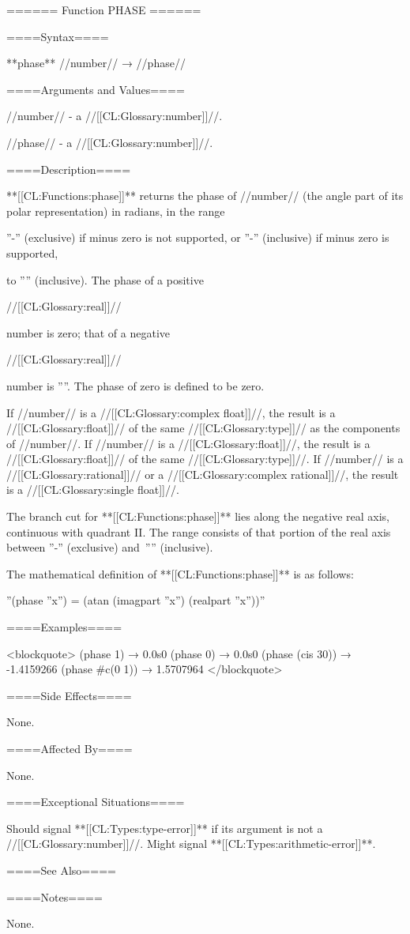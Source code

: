 ====== Function PHASE ======

====Syntax====

**phase** //number// → //phase//

====Arguments and Values====

//number// - a //[[CL:Glossary:number]]//.

//phase// - a //[[CL:Glossary:number]]//.

====Description====

**[[CL:Functions:phase]]** returns the phase of //number// (the angle part of its polar representation) in radians, in the range

''-\pi'' (exclusive) if minus zero is not supported, or ''-\pi'' (inclusive) if minus zero is supported,

to ''\pi'' (inclusive). The phase of a positive

//[[CL:Glossary:real]]//

number is zero; that of a negative

//[[CL:Glossary:real]]//

number is ''\pi''. The phase of zero is defined to be zero.

If //number// is a //[[CL:Glossary:complex float]]//, the result is a //[[CL:Glossary:float]]// of the same //[[CL:Glossary:type]]// as the components of //number//. If //number// is a //[[CL:Glossary:float]]//, the result is a //[[CL:Glossary:float]]// of the same //[[CL:Glossary:type]]//. If //number// is a //[[CL:Glossary:rational]]// or a //[[CL:Glossary:complex rational]]//, the result is a //[[CL:Glossary:single float]]//.

The branch cut for **[[CL:Functions:phase]]** lies along the negative real axis, continuous with quadrant II. The range consists of that portion of the real axis between ''-\pi'' (exclusive) and~''\pi'' (inclusive).

The mathematical definition of **[[CL:Functions:phase]]** is as follows:

''(phase ''x'') = (atan (imagpart ''x'') (realpart ''x''))''


====Examples====

<blockquote> (phase 1) → 0.0s0 (phase 0) → 0.0s0 (phase (cis 30)) → -1.4159266 (phase #c(0 1)) → 1.5707964 </blockquote>

====Side Effects====

None.

====Affected By====

None.

====Exceptional Situations====

Should signal **[[CL:Types:type-error]]** if its argument is not a //[[CL:Glossary:number]]//. Might signal **[[CL:Types:arithmetic-error]]**.

====See Also====

{\secref\FloatSubstitutability}

====Notes====

None.

   
